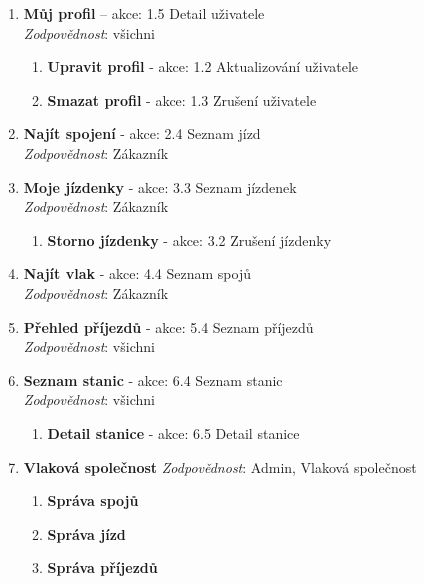 \documentclass[11pt]{article}
\begin{document}
\begin{enumerate}
    \item \textbf{Můj profil} – akce: 1.5 Detail uživatele\\
        \textit{Zodpovědnost}: všichni
        \begin{enumerate}
            \item \textbf{Upravit profil} - akce: 1.2 Aktualizování uživatele
            \item \textbf{Smazat profil} - akce: 1.3 Zrušení uživatele
        \end{enumerate}

    \item \textbf{Najít spojení} - akce: 2.4 Seznam jízd\\
        \textit{Zodpovědnost}: Zákazník

    \item \textbf{Moje jízdenky} - akce: 3.3 Seznam jízdenek\\
        \textit{Zodpovědnost}: Zákazník
        \begin{enumerate}
            \item \textbf{Storno jízdenky} - akce: 3.2 Zrušení jízdenky
        \end{enumerate}
    
    \item \textbf{Najít vlak} - akce: 4.4 Seznam spojů\\
        \textit{Zodpovědnost}: Zákazník

    \item \textbf{Přehled příjezdů} - akce: 5.4 Seznam příjezdů\\
        \textit{Zodpovědnost}: všichni

    \item \textbf{Seznam stanic} - akce: 6.4 Seznam stanic\\
        \textit{Zodpovědnost}: všichni
        \begin{enumerate}
            \item \textbf{Detail stanice} - akce: 6.5 Detail stanice
        \end{enumerate}

    \item \textbf{Vlaková společnost}
        \textit{Zodpovědnost}: Admin, Vlaková společnost
        \begin{enumerate}
            \item \textbf{Správa spojů}
            \item \textbf{Správa jízd}
            \item \textbf{Správa příjezdů}
        \end{enumerate}
    

\end{enumerate}
\end{document}
